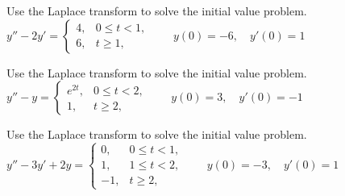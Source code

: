 \documentclass{ximera}
\begin{document}
\begin{problem}\label{exer:8.5.3} Use the Laplace transform to solve the initial value problem.
$y''-2y'= \left\{\begin{array}{cl} 4,&0\le
t<1,\\ 6,&t\ge 1,\end{array}\right.\qquad y(0)=-6,\quad y'(0)=1$
\end{problem}

\begin{problem}\label{exer:8.5.4} Use the Laplace transform to solve the initial value problem.
$y''-y=\left\{\begin{array}{cl} e^{2t},&0\le
t< 2,\\ 1,&t\ge 2,\end{array}\right.\qquad y(0)=3,\quad y'(0)=-1$
\end{problem}

\begin{problem}\label{exer:8.5.5} Use the Laplace transform to solve the initial value problem.
$y''-3y'+2y= \left\{\begin{array}{rl} 0,&0\le
t<1,\\ 1,&1\le t<2,\\ -1,&t\ge 2,\end{array}\right.\qquad y(0)=-3,\quad y'(0)=1$
\end{problem}
\end{document}
